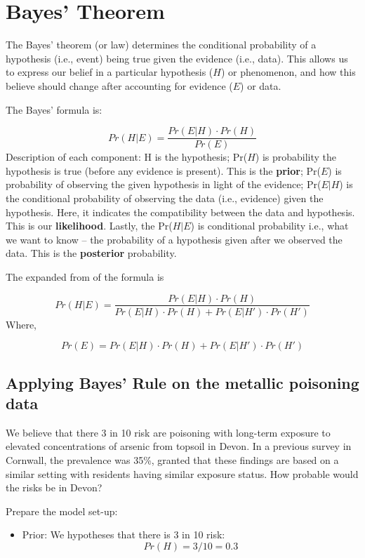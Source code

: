 \documentclass[
]{book}
\providecommand{\tightlist}{%
  \setlength{\itemsep}{0pt}\setlength{\parskip}{0pt}}
\begin{document}
\hypertarget{bayes-theorem}{%
\section{Bayes' Theorem}\label{bayes-theorem}}

The Bayes' theorem (or law) determines the conditional probability of a hypothesis (i.e., event) being true given the evidence (i.e., data). This allows us to express our belief in a particular hypothesis (\(H\)) or phenomenon, and how this believe should change after accounting for evidence (\(E\)) or data.

The Bayes' formula is:

\[Pr(H | E) = \frac{Pr(E|H)\cdot Pr(H)}{Pr(E)}\]
Description of each component: H is the hypothesis; Pr(\(H\)) is probability the hypothesis is true (before any evidence is present). This is the \textbf{prior}; Pr(\(E\)) is probability of observing the given hypothesis in light of the evidence; Pr(\(E|H\)) is the conditional probability of observing the data (i.e., evidence) given the hypothesis. Here, it indicates the compatibility between the data and hypothesis. This is our \textbf{likelihood}. Lastly, the Pr(\(H|E\)) is conditional probability i.e., what we want to know -- the probability of a hypothesis given after we observed the data. This is the \textbf{posterior} probability.

The expanded from of the formula is

\[Pr(H | E) = \frac{Pr(E|H)\cdot Pr(H)}{Pr(E|H) \cdot Pr(H) + Pr(E|H') \cdot Pr(H')}\]
Where,

\[Pr(E) = Pr(E|H) \cdot Pr(H) + Pr(E|H') \cdot Pr(H')\]

\hypertarget{applying-bayes-rule-on-the-metallic-poisoning-data}{%
\subsection{Applying Bayes' Rule on the metallic poisoning data}\label{applying-bayes-rule-on-the-metallic-poisoning-data}}

We believe that there 3 in 10 risk are poisoning with long-term exposure to elevated concentrations of arsenic from topsoil in Devon. In a previous survey in Cornwall, the prevalence was 35\%, granted that these findings are based on a similar setting with residents having similar exposure status. How probable would the risks be in Devon?

Prepare the model set-up:

\begin{itemize}
\tightlist
\item
  Prior: We hypotheses that there is 3 in 10 risk: \[Pr(H) = 3/10 = 0.3\]
\end{itemize}
\end{document}
